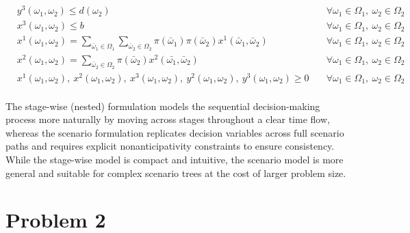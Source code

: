 \documentclass[8pt]{article}
\begin{document}
\begin{subequations}
\begin{align}
         & y^3(\omega_1, \omega_2) \leq d(\omega_2)
         & \quad \forall \omega_1 \in \Omega_1,\ \omega_2 \in \Omega_2                                                                                                                 \\
         & x^3(\omega_1, \omega_2) \leq b
         & \quad \forall \omega_1 \in \Omega_1,\ \omega_2 \in \Omega_2                                                                                                                 \\
         & x^1(\omega_1, \omega_2) = \sum_{\bar{\omega}_1 \in \Omega_1} \sum_{\bar{\omega}_2 \in \Omega_2} \pi(\bar{\omega}_1) \pi(\bar{\omega}_2) x^1(\bar{\omega}_1, \bar{\omega}_2)
         & \quad \forall \omega_1 \in \Omega_1,\ \omega_2 \in \Omega_2                                                                                                                 \\
         & x^2(\omega_1, \omega_2) = \sum_{\bar{\omega}_2 \in \Omega_2} \pi(\bar{\omega}_2) x^2(\bar{\omega_1}, \bar{\omega}_2)
         & \quad \forall \omega_1 \in \Omega_1,\ \omega_2 \in \Omega_2                                                                                                                 \\
         & x^1(\omega_1, \omega_2),\ x^2(\omega_1, \omega_2),\ x^3(\omega_1, \omega_2),\ y^2(\omega_1, \omega_2),\ y^3(\omega_1, \omega_2) \geq 0
         & \quad \forall \omega_1 \in \Omega_1,\ \omega_2 \in \Omega_2
    \end{align}
\end{subequations}
\\
The stage-wise (nested) formulation models the sequential decision-making process more naturally by moving across stages throughout a clear time flow, whereas the scenario formulation replicates decision variables across full scenario paths and requires explicit nonanticipativity constraints to ensure consistency. While the stage-wise model is compact and intuitive, the scenario model is more general and suitable for complex scenario trees at the cost of larger problem size.

\section*{Problem 2}
\end{document}
